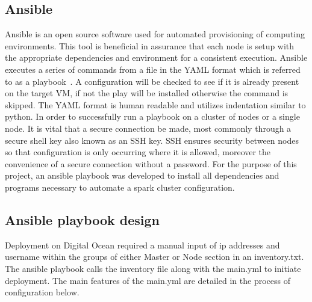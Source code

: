 \subsection{Ansible}
Ansible is an open source software used for automated provisioning of
computing environments.  This tool is beneficial in assurance that
each node is setup with the appropriate dependencies and environment
for a consistent execution.  Ansible executes a series of commands
from a file in the YAML format which is referred to as a
playbook~\cite{www-ansible}.  A configuration will be checked to see
if it is already present on the target VM, if not the play will be
installed otherwise the command is skipped.  The YAML format is human
readable and utilizes indentation similar to python.  In order to
successfully run a playbook on a cluster of nodes or a single node.
It is vital that a secure connection be made, most commonly through a
secure shell key also known as an SSH key.  SSH ensures security
between nodes so that configuration is only occurring where it is
allowed, moreover the convenience of a secure connection without a
password.  For the purpose of this project, an ansible playbook was
developed to install all dependencies and programs necessary to
automate a spark cluster configuration.

\subsection{Ansible playbook design}
Deployment on Digital Ocean required a manual input of ip addresses
and username within the groups of either Master or Node section in an
inventory.txt.  The ansible playbook calls the inventory file along
with the main.yml to initiate deployment.  The main features of the
main.yml are detailed in the process of configuration below.

